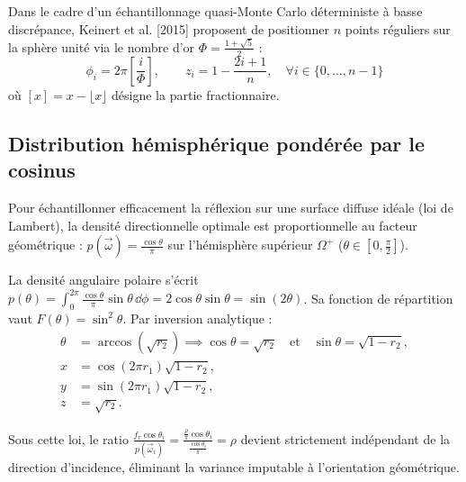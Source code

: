 \begin{remark}
    Dans le cadre d'un échantillonnage quasi-Monte Carlo déterministe à basse discrépance, Keinert et al. [2015] proposent de positionner $n$ points réguliers sur la sphère unité via le nombre d'or $\Phi = \frac{1 + \sqrt{5}}{2}$ :
    \begin{equation}
        \phi_i = 2\pi \left[ \frac{i}{\Phi} \right], \qquad z_i = 1 - \frac{2i + 1}{n}, \quad \forall i \in \{0, \dots, n-1\}
    \end{equation}
    où $[x] = x - \lfloor x \rfloor$ désigne la partie fractionnaire.
\end{remark}

\subsection{Distribution hémisphérique pondérée par le cosinus}

Pour échantillonner efficacement la réflexion sur une surface diffuse idéale (loi de Lambert), la densité directionnelle optimale est proportionnelle au facteur géométrique : $p(\vec{\omega}) = \frac{\cos\theta}{\pi}$ sur l'hémisphère supérieur $\Omega^+$ ($\theta \in [0, \frac{\pi}{2}]$).

\begin{proposition}
    La densité angulaire polaire s'écrit $p(\theta) = \int_0^{2\pi} \frac{\cos\theta}{\pi} \sin\theta \, \dd\phi = 2 \cos\theta \sin\theta = \sin(2\theta)$. Sa fonction de répartition vaut $F(\theta) = \sin^2\theta$. Par inversion analytique :
    \begin{align}
        \theta &= \arccos(\sqrt{r_2}) \implies \cos\theta = \sqrt{r_2} \quad \text{et} \quad \sin\theta = \sqrt{1 - r_2}, \\
        x &= \cos(2\pi r_1) \sqrt{1 - r_2}, \\
        y &= \sin(2\pi r_1) \sqrt{1 - r_2}, \\
        z &= \sqrt{r_2}.
    \end{align}
\end{proposition}

Sous cette loi, le ratio $\frac{f_r \cos\theta_i}{p(\vec{\omega}_i)} = \frac{\frac{\rho}{\pi} \cos\theta_i}{\frac{\cos\theta_i}{\pi}} = \rho$ devient strictement indépendant de la direction d'incidence, éliminant la variance imputable à l'orientation géométrique.


